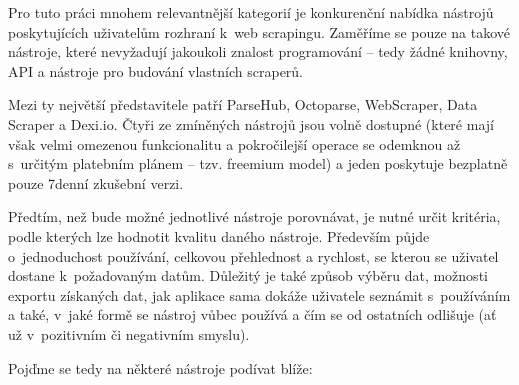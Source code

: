 \documentclass[thesis=B,czech]{FITthesis2}[2012/06/26]
\begin{document}
	Pro tuto práci mnohem relevantnější kategorií je konkurenční nabídka nástrojů poskytujících uživatelům rozhraní k~web scrapingu. Zaměříme se pouze na takové nástroje, které nevyžadují jakoukoli znalost programování -- tedy žádné knihovny, API a nástroje pro budování vlastních scraperů.
	
	Mezi ty největší představitele patří ParseHub, Octoparse, WebScraper, Data Scraper a Dexi.io. Čtyři ze zmíněných nástrojů jsou volně dostupné (které mají však velmi omezenou funkcionalitu a pokročilejší operace se odemknou až s~určitým platebním plánem -- tzv. freemium model) a jeden poskytuje bezplatně pouze 7denní zkušební verzi.
	
	Předtím, než bude možné jednotlivé nástroje porovnávat, je nutné určit kritéria, podle kterých lze hodnotit kvalitu daného nástroje. Především půjde o~jednoduchost používání, celkovou přehlednost a rychlost, se kterou se uživatel dostane k~požadovaným datům. Důležitý je také způsob výběru dat, možnosti exportu získaných dat, jak aplikace sama dokáže uživatele seznámit s~používáním a také, v~jaké formě se nástroj vůbec používá a čím se od ostatních odlišuje (ať už v~pozitivním či negativním smyslu). 
	
	Poj\v{d}me se tedy na některé nástroje podívat blíže:
	
\end{document}
